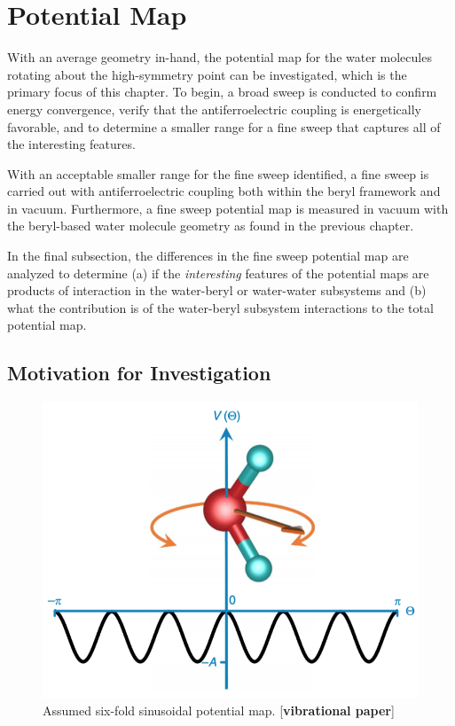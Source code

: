 \chapter{Potential Map}
\label{ch:pot_map}

With an average geometry in-hand, the potential map for the water molecules rotating about the high-symmetry point can be investigated, which is the primary focus of this chapter. To begin, a broad sweep is conducted to confirm energy convergence, verify that the antiferroelectric coupling is energetically favorable, and to determine a smaller range for a fine sweep that captures all of the interesting features. 

With an acceptable smaller range for the fine sweep identified, a fine sweep is carried out with antiferroelectric coupling both within the beryl framework and in vacuum. Furthermore, a fine sweep potential map is measured in vacuum with the beryl-based water molecule geometry as found in the previous chapter. 

In the final subsection, the differences in the fine sweep potential map are analyzed to determine (a) if the \textit{interesting} features of the potential maps are products of interaction in the water-beryl or water-water subsystems and (b) what the contribution is of the water-beryl subsystem interactions to the total potential map.

    \section{Motivation for Investigation}
    
    \begin{figure}
        \centering
        \includegraphics[width=0.7\linewidth]{Figures/System/pmap_misha.png}
        \caption{Assumed six-fold sinusoidal potential map. [\textbf{vibrational paper}]}
        \label{fig:pmap_misha}
    \end{figure}
    
